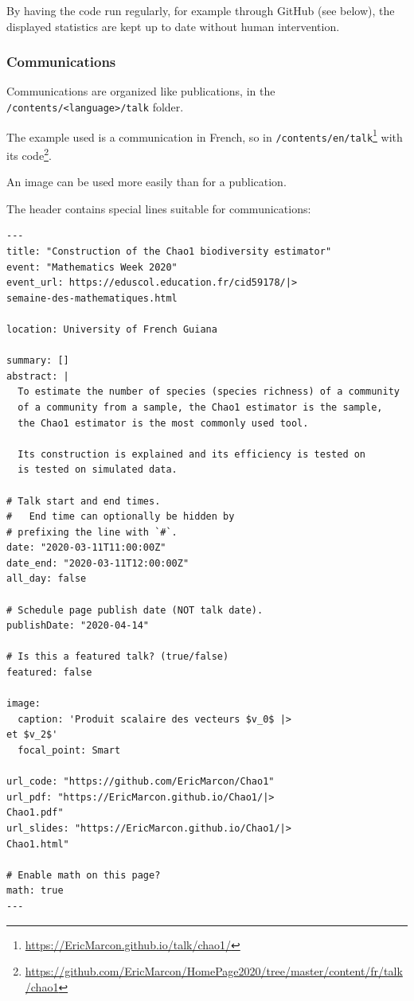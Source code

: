 \documentclass[
  12pt,
  american,
  a4paper,
  extrafontsizes,onecolumn,openright
  ]{memoir}
\begin{document}
By having the code run regularly, for example through GitHub (see below), the displayed statistics are kept up to date without human intervention.

\subsubsection{Communications}\label{communications}

Communications are organized like publications, in the \texttt{/contents/\textless{}language\textgreater{}}\break\texttt{/talk} folder.

The example used is a communication in French, so in \texttt{/contents/en/talk}\footnote{\url{https://EricMarcon.github.io/talk/chao1/}} with its code\footnote{\url{https://github.com/EricMarcon/HomePage2020/tree/master/content/fr/talk/chao1}}.

An image can be used more easily than for a publication.

The header contains special lines suitable for communications:

\begin{verbatim}
---
title: "Construction of the Chao1 biodiversity estimator"
event: "Mathematics Week 2020"
event_url: https://eduscol.education.fr/cid59178/|>
semaine-des-mathematiques.html

location: University of French Guiana

summary: []
abstract: |
  To estimate the number of species (species richness) of a community 
  of a community from a sample, the Chao1 estimator is the sample, 
  the Chao1 estimator is the most commonly used tool.

  Its construction is explained and its efficiency is tested on
  is tested on simulated data.

# Talk start and end times.
#   End time can optionally be hidden by 
# prefixing the line with `#`.
date: "2020-03-11T11:00:00Z"
date_end: "2020-03-11T12:00:00Z"
all_day: false

# Schedule page publish date (NOT talk date).
publishDate: "2020-04-14"

# Is this a featured talk? (true/false)
featured: false

image:
  caption: 'Produit scalaire des vecteurs $v_0$ |>
et $v_2$'
  focal_point: Smart

url_code: "https://github.com/EricMarcon/Chao1"
url_pdf: "https://EricMarcon.github.io/Chao1/|>
Chao1.pdf"
url_slides: "https://EricMarcon.github.io/Chao1/|>
Chao1.html"

# Enable math on this page?
math: true
---
\end{verbatim}
\end{document}
